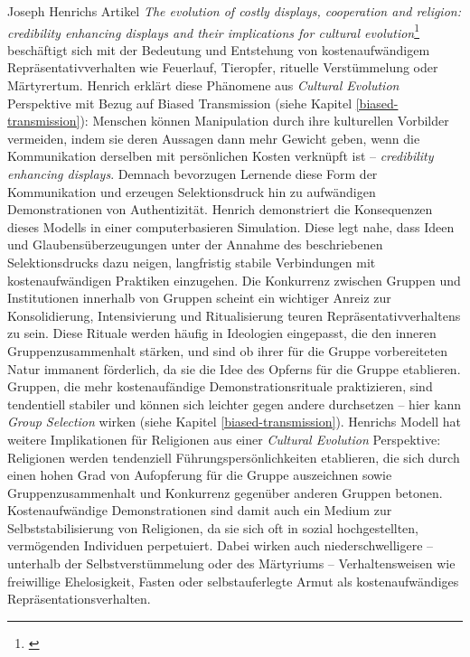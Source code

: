 \documentclass[openany,twoside,twocolumn]{book}
\let\rmarkdownfootnote\footnote%
\def\footnote{\protect\rmarkdownfootnote}
\begin{document}
Joseph Henrichs Artikel \emph{The evolution of costly displays, cooperation and religion: credibility enhancing displays and their implications for cultural evolution}\footnote{\textcite{henrich_evolution_2009}} beschäftigt sich mit der Bedeutung und Entstehung von kostenaufwändigem Repräsentativverhalten wie Feuerlauf, Tieropfer, rituelle Verstümmelung oder Märtyrertum. Henrich erklärt diese Phänomene aus \emph{Cultural Evolution} Perspektive mit Bezug auf Biased Transmission (siehe Kapitel \ref{biased-transmission}): Menschen können Manipulation durch ihre kulturellen Vorbilder vermeiden, indem sie deren Aussagen dann mehr Gewicht geben, wenn die Kommunikation derselben mit persönlichen Kosten verknüpft ist -- \emph{credibility enhancing displays}. Demnach bevorzugen Lernende diese Form der Kommunikation und erzeugen Selektionsdruck hin zu aufwändigen Demonstrationen von Authentizität. Henrich demonstriert die Konsequenzen dieses Modells in einer computerbasieren Simulation. Diese legt nahe, dass Ideen und Glaubensüberzeugungen unter der Annahme des beschriebenen Selektionsdrucks dazu neigen, langfristig stabile Verbindungen mit kostenaufwändigen Praktiken einzugehen. Die Konkurrenz zwischen Gruppen und Institutionen innerhalb von Gruppen scheint ein wichtiger Anreiz zur Konsolidierung, Intensivierung und Ritualisierung teuren Repräsentativverhaltens zu sein. Diese Rituale werden häufig in Ideologien eingepasst, die den inneren Gruppenzusammenhalt stärken, und sind ob ihrer für die Gruppe vorbereiteten Natur immanent förderlich, da sie die Idee des Opferns für die Gruppe etablieren. Gruppen, die mehr kostenaufändige Demonstrationsrituale praktizieren, sind tendentiell stabiler und können sich leichter gegen andere durchsetzen -- hier kann \emph{Group Selection} wirken (siehe Kapitel \ref{biased-transmission}). Henrichs Modell hat weitere Implikationen für Religionen aus einer \emph{Cultural Evolution} Perspektive: Religionen werden tendenziell Führungspersönlichkeiten etablieren, die sich durch einen hohen Grad von Aufopferung für die Gruppe auszeichnen sowie Gruppenzusammenhalt und Konkurrenz gegenüber anderen Gruppen betonen. Kostenaufwändige Demonstrationen sind damit auch ein Medium zur Selbststabilisierung von Religionen, da sie sich oft in sozial hochgestellten, vermögenden Individuen perpetuiert. Dabei wirken auch niederschwelligere -- unterhalb der Selbstverstümmelung oder des Märtyriums -- Verhaltensweisen wie freiwillige Ehelosigkeit, Fasten oder selbstauferlegte Armut als kostenaufwändiges Repräsentationsverhalten.
\end{document}
